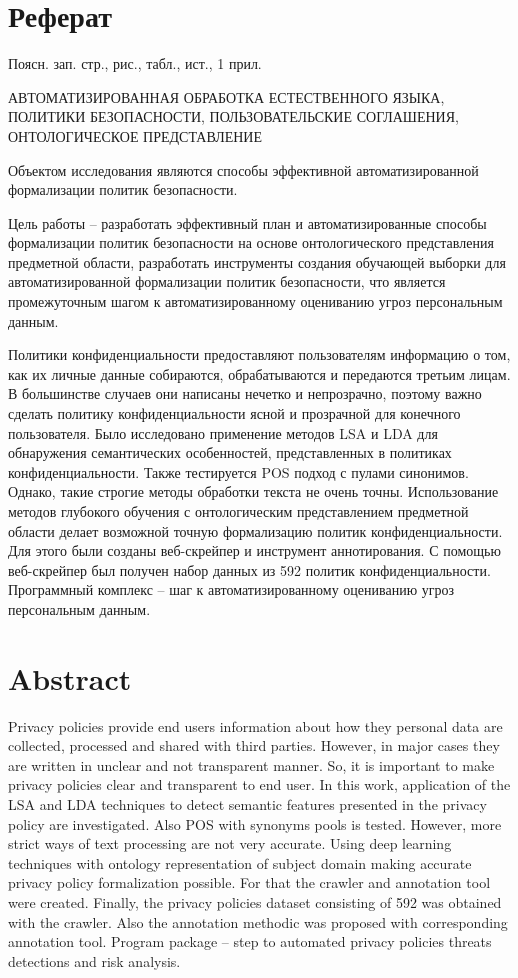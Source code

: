 \documentclass[../main]{subfiles}
\begin{document}
\newpage
{}
\section*{Реферат}
Поясн. зап.  стр.,   рис.,  табл.,  ист., 1 прил.

\begin{jje}
    \MakeUppercase{автоматизированная обработка естественного языка, политики безопасности, пользовательские соглашения, онтологическое представление}
\end{jje}

Объектом  исследования являются способы эффективной автоматизированной формализации политик безопасности.

Цель работы -- разработать эффективный план и автоматизированные способы формализации политик безопасности на основе онтологического представления предметной области, разработать инструменты создания обучающей выборки для автоматизированной формализации политик безопасности, что является промежуточным шагом к автоматизированному оцениванию угроз персональным данным.

Политики конфиденциальности предоставляют пользователям информацию о том, как их личные данные собираются, обрабатываются и передаются третьим лицам. В большинстве случаев они написаны нечетко и непрозрачно, поэтому важно сделать политику конфиденциальности ясной и прозрачной для конечного пользователя. Было исследовано применение методов LSA и LDA для обнаружения семантических особенностей, представленных в политиках конфиденциальности. Также тестируется POS подход с пулами синонимов. Однако, такие строгие методы обработки текста не очень точны. Использование методов глубокого обучения с онтологическим представлением предметной области делает возможной точную формализацию политик конфиденциальности. Для этого были созданы веб-скрейпер и инструмент аннотирования. С помощью веб-скрейпер был получен набор данных из 592 политик конфиденциальности. Программный комплекс -- шаг к автоматизированному оцениванию угроз персональным данным.

\newpage
\section*{Abstract}
Privacy policies provide end users information about how they personal data are collected, processed and shared with third parties. However, in major cases they are written in unclear and not transparent manner. So, it is important to make privacy  policies clear and transparent to end user. In this work, application of the LSA and LDA techniques to detect semantic features presented in the privacy policy are investigated. Also POS with synonyms pools is tested. However, more strict ways of text processing are not very accurate. Using deep learning techniques with ontology representation of subject domain making accurate privacy policy formalization possible. For that the crawler and annotation tool were created. Finally, the privacy policies dataset consisting of 592 was obtained with the crawler. Also the annotation methodic was proposed with corresponding annotation tool. Program package -- step to automated privacy policies threats detections and risk analysis.
\end{document}
